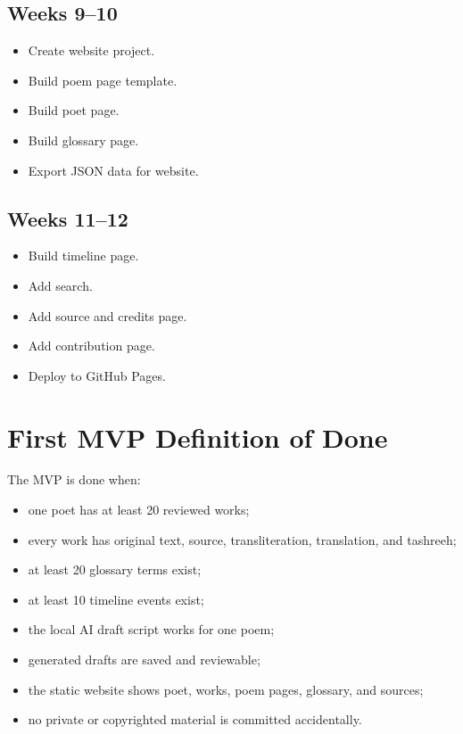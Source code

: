 \documentclass[11pt]{article}
\begin{document}
\subsection{Weeks 9--10}

\begin{itemize}
  \item Create website project.
  \item Build poem page template.
  \item Build poet page.
  \item Build glossary page.
  \item Export JSON data for website.
\end{itemize}

\subsection{Weeks 11--12}

\begin{itemize}
  \item Build timeline page.
  \item Add search.
  \item Add source and credits page.
  \item Add contribution page.
  \item Deploy to GitHub Pages.
\end{itemize}

\section{First MVP Definition of Done}

The MVP is done when:

\begin{itemize}
  \item one poet has at least 20 reviewed works;
  \item every work has original text, source, transliteration, translation, and
  tashreeh;
  \item at least 20 glossary terms exist;
  \item at least 10 timeline events exist;
  \item the local AI draft script works for one poem;
  \item generated drafts are saved and reviewable;
  \item the static website shows poet, works, poem pages, glossary, and sources;
  \item no private or copyrighted material is committed accidentally.
\end{itemize}
\end{document}
